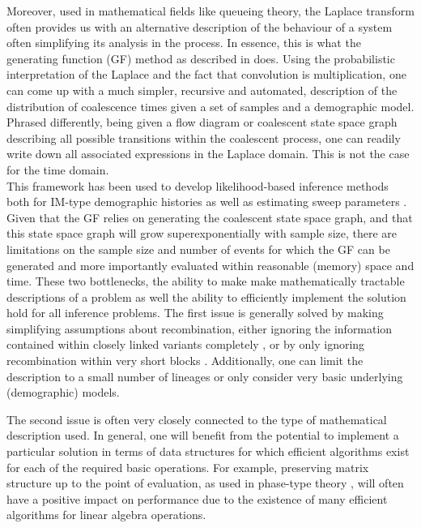 \documentclass[10pt, a4]{article}
\begin{document}
Moreover, used in mathematical fields like queueing theory, the Laplace transform often provides us with an alternative description of the behaviour of a system often simplifying its analysis in the process. In essence, this is what the generating function (GF) method as described in \citet{Lohse2011} does. Using the probabilistic interpretation of the Laplace and the fact that convolution is multiplication, one can come up with a much simpler, recursive and automated, description of the distribution of coalescence times given a set of samples and a demographic model. Phrased differently, being given a flow diagram or coalescent state space graph describing all possible transitions within the coalescent process, one can readily write down all associated expressions in the Laplace domain. This is not the case for the time domain.\\

This framework has been used to develop likelihood-based inference methods both for IM-type demographic histories \citep{Lohse2011, Bunnefeld2015, Lohse2016} as well as estimating sweep parameters \citep{Bisschop2021}. Given that the GF relies on generating the coalescent state space graph, and that this state space graph will grow superexponentially with sample size, there are limitations on the sample size and number of events for which the GF can be generated and more importantly evaluated within reasonable (memory) space and time. These two bottlenecks, the ability to make make mathematically tractable descriptions of a problem as well the ability to efficiently implement the solution hold for all inference problems. The first issue is generally solved by making simplifying assumptions about recombination, either ignoring the information contained within closely linked variants completely \citep{Gutenkunst2009, Excoffier2013}, or by only ignoring recombination within very short blocks \citep{Yang2002, Hey2004}. Additionally, one can limit the description to a small number of lineages or only consider very basic underlying (demographic) models.

The second issue is often very closely connected to the type of mathematical description used. In general, one will benefit from the potential to implement a particular solution in terms of data structures for which efficient algorithms exist for each of the required basic operations. For example, preserving matrix structure up to the point of evaluation, as used in phase-type theory \citep{Hobolth2019}, will often have a positive impact on performance due to the existence of many efficient algorithms for linear algebra operations.
\end{document}
